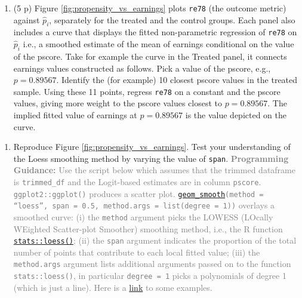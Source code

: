 \documentclass[
]{article}
\providecommand{\tightlist}{%
  \setlength{\itemsep}{0pt}\setlength{\parskip}{0pt}}
\begin{document}
\begin{enumerate}
\def\labelenumi{\arabic{enumi}.}
\setcounter{enumi}{1}
\tightlist
\item
  (5 p) Figure \ref{fig:propensity_vs_earnings} plots \texttt{re78} (the
  outcome metric) against \(\widehat{p}_{i}\), separately for the
  treated and the control groups. Each panel also includes a curve that
  displays the fitted non-parametric regression of \texttt{re78} on
  \(\widehat{p}_{i}\) i.e., a smoothed estimate of the mean of earnings
  conditional on the value of the pscore. Take for example the curve in
  the Treated panel, it connects earnings values constructed as follows.
  Pick a value of the pscore, e.g., \(p=0.89567\). Identify the (for
  example) 10 closest pscore values in the treated sample. Using these
  11 points, regress \texttt{re78} on a constant and the pscore values,
  giving more weight to the pscore values closest to \(p=0.89567\). The
  implied fitted value of earnings at \(p=0.89567\) is the value
  depicted on the curve.
\end{enumerate}

\begin{enumerate}
\def\labelenumi{\alph{enumi}.}
\tightlist
\item
  Reproduce Figure \ref{fig:propensity_vs_earnings}. Test your
  understanding of the Loess smoothing method by varying the value of
  \texttt{span}.
  \textcolor{gray}{\textbf{Programming Guidance:} Use the script below which assumes that the trimmed dataframe is \texttt{trimmed\_df} and the Logit-based estimates are in column \texttt{pscore}. \texttt{ggplot2::ggplot()} produces a scatter plot. \href{https://ggplot2.tidyverse.org/reference/geom_smooth.html}{\texttt{geom\_smooth}}\texttt{(method = ``loess'', span = 0.5, method.args = list(degree = 1))} overlays a smoothed curve: (i) the \texttt{method} argument picks the LOWESS (LOcally WEighted Scatter-plot Smoother) smoothing method, i.e., the R function \href{https://www.rdocumentation.org/packages/stats/versions/3.6.2/topics/loess}{\texttt{stats::loess()}}; (ii) the \texttt{span} argument indicates the proportion of the total number of points that contribute to each local fitted value; (iii) the \texttt{method.args} argument lists additional arguments passed on to the function \texttt{stats::loess()}, in particular \texttt{degree = 1} picks a polynomials of degree 1 (which is just a line). Here is a \href{https://ggplot2.tidyverse.org/reference/geom_smooth.html}{link} to some examples.}
\end{enumerate}
\end{document}
